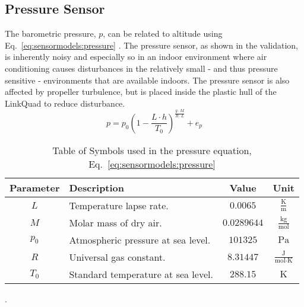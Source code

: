     \subsection{Pressure Sensor}
        The barometric pressure, $p$, can be related to altitude using Eq.~\eqref{eq:sensormodels:pressure} \cite{physicshandbook}.
        The pressure sensor, as shown in the validation, is inherently
        noisy and especially so in an indoor environment where air conditioning
        causes disturbances in the relatively small - and thus pressure sensitive -
        environments that are available indoors.
        The pressure sensor is also affected by propeller turbulence, but 
        is placed inside the plastic hull of the LinkQuad to reduce disturbance.
        \begin{equation}
            \label{eq:sensormodels:pressure}
            p = p_{0} \left( 1 - \frac{L \cdot h}{T_{0}} \right)^{\frac{g \cdot M}{R\cdot L}} + e_{p}
        \end{equation}
        \begin{table}
            \begin{tabularx}{\tablewidth}{|c|X|c|c|}\hline
                \textbf{Parameter} & \textbf{Description} & \textbf{Value} & \textbf{Unit} \\\hline
                $L$       & Temperature lapse rate.            & $0.0065$ & $\frac{\text{K}}{\text{m}}$ \\\hline
                $M$       & Molar mass of dry air.             & $0.0289644$ & $\frac{\text{kg}}{\text{mol}}$ \\\hline
                $p_{0}$   & Atmospheric pressure at sea level. & $101325$ & $\text{Pa}$ \\\hline
                $R$       & Universal gas constant.            & $8.31447$ & $\frac{\text{J}}{\text{mol} \cdot \text{K}}$ \\\hline
                $T_{0}$   & Standard temperature at sea level. & $288.15$ & $\text{K}$ \\\hline
            \end{tabularx}
            \label{tos:pressuresensor}
            \caption{Table of Symbols used in the pressure equation, Eq.~\eqref{eq:sensormodels:pressure}}.
        \end{table}

    
